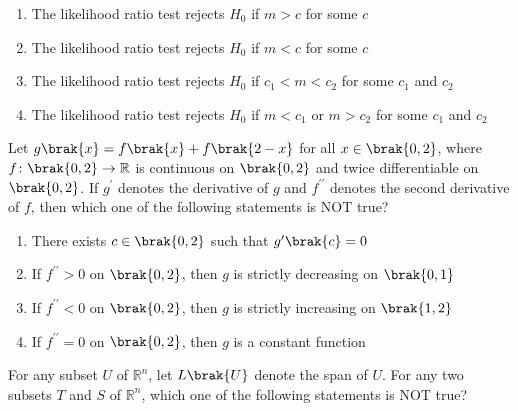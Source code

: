     \begin{enumerate}
        \item The likelihood ratio test rejects $H_0$ if $m > c$ for some $c$
        \item The likelihood ratio test rejects $H_0$ if $m < c$ for some $c$
        \item The likelihood ratio test rejects $H_0$ if $c_1 < m < c_2$ for some $c_1$ and $c_2$
        \item The likelihood ratio test rejects $H_0$ if $m < c_1$ or $m > c_2$ for some $c_1$ and $c_2$\\
    \end{enumerate}
    \item  Let $g\brak{x} = f\brak{x} + f\brak{2-x}$ for all $x \in \brak{0,2}$, where $f \colon\brak{0,2} \to \mathbb{R}$ is continuous on $\brak{0,2}$ and twice differentiable on $\brak{0,2}$. If $g^\prime$ denotes the derivative of $g$ and $f^{\prime\prime}$ denotes the second derivative of $f$, then which one of the following statements is NOT true?  


    \begin{enumerate}
        \item There exists $c \in \brak{0,2}$ such that $g^\prime\brak{c} = 0$
        \item If $f^{\prime\prime} > 0$ on $\brak{0,2}$, then $g$ is strictly decreasing on $\brak{0,1}$
        \item  If $f^{\prime\prime} < 0$ on $\brak{0,2}$, then $g$ is strictly increasing on $\brak{1,2}$
        \item If $f^{\prime\prime} = 0$ on $\brak{0,2}$, then $g$ is a constant function\\
    \end{enumerate}
    \item For any subset $U$ of $\mathbb{R}^n$, let $L\brak{U}$ denote the span of $U$. For any two subsets $T$ and $S$ of $\mathbb{R}^n$, which one of the following statements is NOT true?


